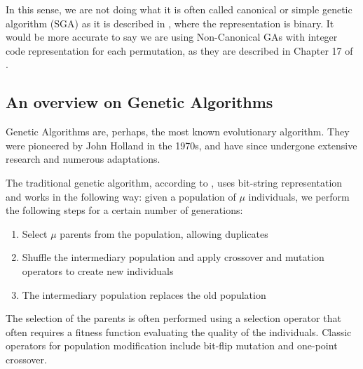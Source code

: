 \documentclass[12pt]{article}
\begin{document}
In this sense, we are not doing what it is often called canonical or simple genetic algorithm (SGA) as it is described in \cite{Eiben2003}, where the representation is binary. It would be more accurate to say we are using Non-Canonical GAs with integer code representation for each permutation, as they are described in Chapter 17 of \cite{Back2000}.  



\subsection{An overview on Genetic Algorithms}
Genetic Algorithms are, perhaps, the most known evolutionary algorithm. They were pioneered by John Holland in the 1970s, and have since undergone extensive research and numerous adaptations. 

The traditional genetic algorithm, according to \cite{Eiben2003}, uses bit-string representation and works in the following way:
given a population of $\mu$ individuals, we perform the following steps for a certain number of generations:
\begin{enumerate}
    \item Select $\mu$ parents from the population, allowing duplicates
    \item Shuffle the intermediary population and apply crossover and mutation operators to create new individuals
    \item The intermediary population replaces the old population
\end{enumerate}

The selection of the parents is often performed using a selection operator that often requires a fitness function evaluating the quality of the individuals. Classic operators for population modification include bit-flip mutation and one-point crossover.
\end{document}

